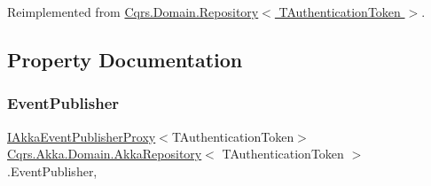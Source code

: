 Reimplemented from \hyperlink{classCqrs_1_1Domain_1_1Repository_aef4df40c39f3edc0f9259089cbd3400e}{Cqrs.\+Domain.\+Repository$<$ T\+Authentication\+Token $>$}.



\subsection{Property Documentation}
\mbox{\label{classCqrs_1_1Akka_1_1Domain_1_1AkkaRepository_a52d17021123b6f56b213312351a83d55}} 
\subsubsection{\texorpdfstring{Event\+Publisher}{EventPublisher}}
{\footnotesize\ttfamily \hyperlink{interfaceCqrs_1_1Akka_1_1Events_1_1IAkkaEventPublisherProxy}{I\+Akka\+Event\+Publisher\+Proxy}$<$T\+Authentication\+Token$>$ \hyperlink{classCqrs_1_1Akka_1_1Domain_1_1AkkaRepository}{Cqrs.\+Akka.\+Domain.\+Akka\+Repository}$<$ T\+Authentication\+Token $>$.Event\+Publisher\hspace{0.3cm}{\ttfamily [get]}, {\ttfamily [protected]}}

